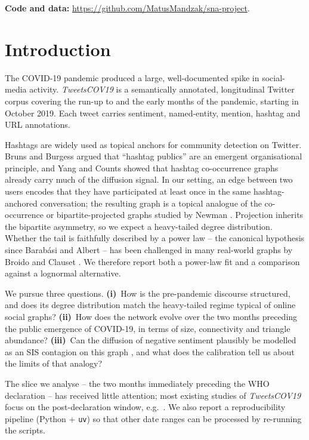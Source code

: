 \documentclass[conference]{IEEEtran}
\begin{document}
\textbf{Code and data:} \url{https://github.com/MatusMandzak/sna-project}.

\section{Introduction}
\label{sec:intro}
The COVID-19 pandemic produced a large, well-documented spike
in social-media activity.  \textit{TweetsCOV19}
\cite{dimitrov2020tweetscov19} is a semantically annotated,
longitudinal Twitter corpus covering the run-up to and the
early months of the pandemic, starting in October 2019.  Each
tweet carries sentiment, named-entity, mention, hashtag and URL
annotations.

Hashtags are widely used as topical anchors for community
detection on Twitter.  Bruns and Burgess
\cite{bruns2015twitter} argued that ``hashtag publics'' are an
emergent organisational principle, and Yang and Counts
\cite{yang2010predicting} showed that hashtag co-occurrence
graphs already carry much of the diffusion signal.  In our
setting, an edge between two users encodes that they have
participated at least once in the same hashtag-anchored
conversation; the resulting graph is a topical analogue of the
co-occurrence or bipartite-projected graphs studied by
Newman \cite{newman2001scientific}.  Projection inherits the
bipartite asymmetry, so we expect a heavy-tailed degree
distribution.  Whether the tail is faithfully described by a
power law -- the canonical hypothesis since Barab\'{a}si and
Albert \cite{barabasi1999emergence} -- has been challenged in
many real-world graphs by Broido and Clauset
\cite{broido2019scale}.  We therefore report both a power-law
fit and a comparison against a lognormal alternative.

We pursue three questions.  \textbf{(i)}~How is the
pre-pandemic discourse structured, and does its degree
distribution match the heavy-tailed regime typical of online
social graphs?  \textbf{(ii)}~How does the network evolve over
the two months preceding the public emergence of COVID-19, in
terms of size, connectivity and triangle abundance?
\textbf{(iii)}~Can the diffusion of negative sentiment
plausibly be modelled as an SIS contagion on this graph
\cite{kermack1927contribution,pastor2001epidemic}, and what
does the calibration tell us about the limits of that analogy?

The slice we analyse -- the two months immediately preceding
the WHO declaration -- has received little attention; most
existing studies of \textit{TweetsCOV19} focus on the
post-declaration window, e.g.\ \cite{cinelli2020covid19}.  We
also report a reproducibility pipeline (Python + \texttt{uv})
so that other date ranges can be processed by re-running the
scripts.
\end{document}
